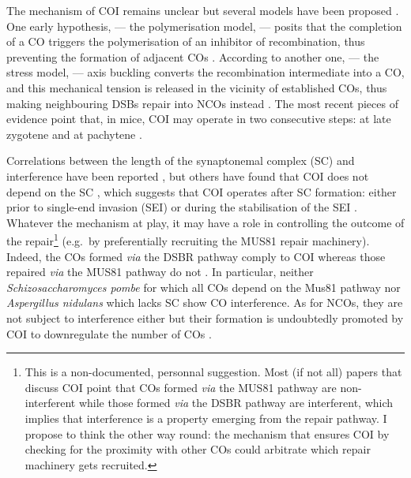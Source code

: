The mechanism of COI remains unclear but several models have been proposed \citep[reviewed in][]{youds2011choice}.
One early hypothesis, — the polymerisation model, — posits that the completion of a CO triggers the polymerisation of an inhibitor of recombination, thus preventing the formation of adjacent COs \citep{maguire1988crossover,king1990polymerization}.
According to another one, — the stress model, — axis buckling converts the recombination intermediate into a CO, and this mechanical tension is released in the vicinity of established COs, thus making neighbouring DSBs repair into NCOs instead \citep{borner2004crossover,kleckner2004mechanical}.
The most recent pieces of evidence point that, in mice, COI may operate in two consecutive steps: at late zygotene and at pachytene \citep{boer2006two}.

Correlations between the length of the synaptonemal complex (SC) and interference have been reported \citep{sym1994crossover,lynn2002covariation,petkov2007crossover}, but others have found that COI does not depend on the SC \citep{deboer2007meiotic,shodhan2014msh4}, which suggests that COI operates after SC formation: either prior to single-end invasion (SEI) \citep{hunter2001singleend, bishop2004early} or during the stabilisation of the SEI \citep{shinohara2008crossover}.\\

Whatever the mechanism at play, it may have a role in controlling the outcome of the repair\footnote{This is a non-documented, personnal suggestion. Most (if not all) papers that discuss COI point that COs formed \textit{via} the MUS81 pathway are non-interferent while those formed \textit{via} the DSBR pathway are interferent, which implies that interference is a property emerging from the repair pathway. I propose to think the other way round: the mechanism that ensures COI by checking for the proximity with other COs could arbitrate which repair machinery gets recruited.} (e.g.\ by preferentially recruiting the MUS81 repair machinery).
Indeed, the COs formed \textit{via} the DSBR pathway comply to COI whereas those repaired \textit{via} the MUS81 pathway do not \citep{santos2003mus81,kohl2013meiotic}.
In particular, neither \textit{Schizosaccharomyces pombe} for which all COs depend on the Mus81 pathway \citep{munz1994analysis,hollingsworth2004mus81,cromie2006single} nor \textit{Aspergillus nidulans} which lacks SC \citep[reviewed in \citealp{shaw1998meiosis} and \citealp{egel1995synaptonemal}]{strickland1958analysis} show CO interference.
As for NCOs, they are not subject to interference either \citep{malkova2004gene,baudat2007regulating,miller2016wholegenome} but their formation is undoubtedly promoted by COI to downregulate the number of COs \citep{rockmill2003sgs1,youds2010rtel1,crismani2012fancm,seguela-arnaud2015multiple}.



